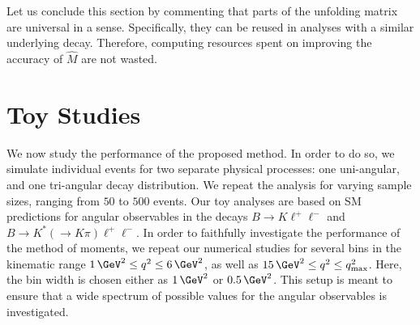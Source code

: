 \documentclass[aps,prd,reprint,nofootinbib,preprintnumbers]{revtex4}
\newcommand{\est}[1]{\widehat{#1}}
\newcommand{\add}[1]{\textcolor{green!85!black}{#1}}
\begin{document}
Let us conclude this section by commenting that parts of the unfolding
matrix are universal in a sense. Specifically, they can be reused in analyses with a similar underlying decay.
Therefore, computing resources spent on improving \add{the accuracy of $\est{M}$} are not wasted.


\section{Toy Studies}
\label{sec:numerics}

We now study the performance of the proposed method. In order to do so, we simulate
individual events for two separate physical processes: one uni-angular, and one tri-angular decay
distribution. We repeat the analysis for varying sample sizes, ranging from
$50$ to $500$ events. Our toy analyses are based on SM predictions for angular observables
in the decays $B\to K\ell^+\ell^-$ and $B\to K^*(\to K\pi)\ell^+\ell^-$.
In order to faithfully investigate the performance of the method of moments, we repeat our
numerical studies for several bins in the kinematic range $1\,\GeV^2 \leq q^2 \leq 6\,\GeV^2$,
as well as $15\,\GeV^2 \leq q^2 \leq q^2_\text{max}$. Here, the bin width is chosen either
as $1\,\GeV^2$ or $0.5\,\GeV^2$. This setup is meant to ensure that a wide spectrum of possible
values for the angular observables is investigated.\\
\end{document}
